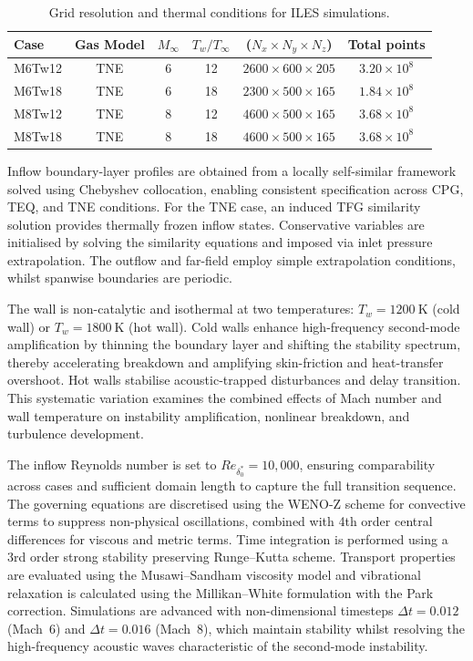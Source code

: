 \begin{table}[hbt!]
\centering
\caption{Grid resolution and thermal conditions for ILES simulations.}
\begin{tabular}{lccccc}
\toprule
Case & Gas Model & $M_\infty$ & $T_w/T_\infty$ &  ($N_x \times N_y \times N_z$) & Total points \\
\midrule
M6Tw12 & TNE & 6 & 12 & $2600 \times 600 \times 205$ & $3.20\times 10^8$ \\
M6Tw18 & TNE & 6 & 18 & $2300 \times 500 \times 165$ & $1.84\times 10^8$ \\
M8Tw12 & TNE & 8 & 12 & $4600 \times 500 \times 165$ & $3.68\times 10^8$ \\
M8Tw18 & TNE & 8 & 18 & $4600 \times 500 \times 165$ & $3.68\times 10^8$ \\
\bottomrule
\end{tabular}
\label{tab:domain_grid_iles}
\end{table}

Inflow boundary-layer profiles are obtained from a locally self-similar framework solved using Chebyshev collocation, enabling consistent specification across \gls{CPG}, \gls{TEQ}, and \gls{TNE} conditions. For the \gls{TNE} case, an induced \gls{TFG} similarity solution provides thermally frozen inflow states. Conservative variables are initialised by solving the similarity equations and imposed via inlet pressure extrapolation. The outflow and far-field employ simple extrapolation conditions, whilst spanwise boundaries are periodic.

The wall is non-catalytic and isothermal at two temperatures: $T_w=1200~\text{K}$ (cold wall) or $T_w=1800~\text{K}$ (hot wall). Cold walls enhance high-frequency second-mode amplification by thinning the boundary layer and shifting the stability spectrum, thereby accelerating breakdown and amplifying skin-friction and heat-transfer overshoot. Hot walls stabilise acoustic-trapped disturbances and delay transition. This systematic variation examines the combined effects of Mach number and wall temperature on instability amplification, nonlinear breakdown, and turbulence development.

The inflow Reynolds number is set to $Re_{\delta^*_0}=10{,}000$, ensuring comparability across cases and sufficient domain length to capture the full transition sequence. The governing equations are discretised using the WENO-Z scheme for convective terms to suppress non-physical oscillations, combined with 4th order central differences for viscous and metric terms. Time integration is performed using a 3rd order strong stability preserving Runge--Kutta scheme. Transport properties are evaluated using the Musawi--Sandham viscosity model and vibrational relaxation is calculated using the Millikan--White formulation with the Park correction. Simulations are advanced with non-dimensional timesteps $\Delta t = 0.012$ (Mach~6) and $\Delta t = 0.016$ (Mach~8), which maintain stability whilst resolving the high-frequency acoustic waves characteristic of the second-mode instability.



